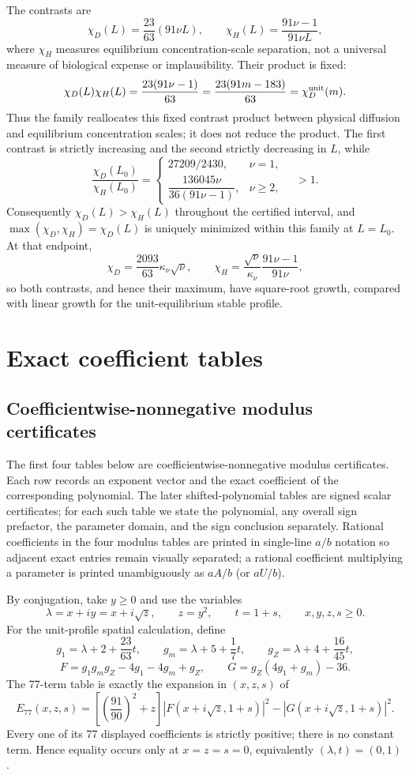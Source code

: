 \documentclass[10pt]{article}
\newcommand{\1}{\mathbf1}
\begin{document}
The contrasts are
\[
 \chi_D(L)=\frac{23}{63}(91\nu L),\qquad
 \chi_H(L)=\frac{91\nu-1}{91\nu L},
\]
where $\chi_H$ measures equilibrium concentration-scale separation, not a
universal measure of biological expense or implausibility.  Their product is
fixed:
\[
 \chi_D(L)\chi_H(L)=\frac{23(91\nu-1)}{63}
 =\frac{23(91m-183)}{63}=\chi_D^{\rm unit}(m).
\]
Thus the family reallocates this fixed contrast product between physical
diffusion and equilibrium concentration scales; it does not reduce the
product.  The first contrast is strictly increasing and the second strictly
decreasing in $L$, while
\[
 \frac{\chi_D(L_0)}{\chi_H(L_0)}=
 \begin{cases}
  27209/2430,&\nu=1,\\[2pt]
  \dfrac{136045\nu}{36(91\nu-1)},&\nu\ge2,
 \end{cases}
 \quad >1.
\]
Consequently $\chi_D(L)>\chi_H(L)$ throughout the certified interval, and
$\max(\chi_D,\chi_H)=\chi_D(L)$ is uniquely minimized within this family at
$L=L_0$.  At that endpoint,
\[
 \chi_D=\frac{2093}{63}\kappa_\nu\sqrt\nu,
 \qquad
 \chi_H=\frac{\sqrt\nu}{\kappa_\nu}\frac{91\nu-1}{91\nu},
\]
so both contrasts, and hence their maximum, have square-root growth, compared
with linear growth for the unit-equilibrium stable profile.

\section{Exact coefficient tables}\label{sec:coefftables}

\subsection{Coefficientwise-nonnegative modulus certificates}

The first four tables below are coefficientwise-nonnegative modulus
certificates.  Each row records an exponent vector and the exact coefficient
of the corresponding polynomial.  The later shifted-polynomial tables are
signed scalar certificates; for each such table we state the polynomial, any
overall sign prefactor, the parameter domain, and the sign conclusion
separately.  Rational coefficients in the four modulus tables are printed in
single-line $a/b$ notation so adjacent exact entries remain visually
separated; a rational coefficient multiplying a parameter is printed
unambiguously as $aA/b$ (or $aU/b$).

By conjugation, take $y\ge0$ and use the variables
\[
 \lambda=x+i y=x+i\sqrt z,\qquad z=y^2,\qquad t=1+s,
 \qquad x,y,z,s\ge0.
\]
For the unit-profile spatial calculation, define
\[
 g_1=\lambda+2+\frac{23}{63}t,\qquad
 g_m=\lambda+5+\frac17t,\qquad
 g_Z=\lambda+4+\frac{16}{45}t,
\]
\[
 F=g_1g_mg_Z-4g_1-4g_m+g_Z,
 \qquad G=g_Z(4g_1+g_m)-36.
\]
The 77-term table is exactly the expansion in $(x,z,s)$ of
\[
 E_{77}(x,z,s)=
 \left[\left(\frac{91}{90}\right)^2+z\right]
 \left|F(x+i\sqrt z,1+s)\right|^2
 -\left|G(x+i\sqrt z,1+s)\right|^2.
\]
Every one of its 77 displayed coefficients is strictly positive; there is no
constant term.  Hence equality occurs only at $x=z=s=0$, equivalently
$(\lambda,t)=(0,1)$.
\end{document}
